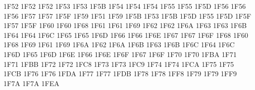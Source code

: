 \setcclcuc 1F52 1F52 1F52 %
\setcclcuc 1F53 1F53 1F5B %
\setcclcuc 1F54 1F54 1F54 %
\setcclcuc 1F55 1F55 1F5D %
\setcclcuc 1F56 1F56 1F56 %
\setcclcuc 1F57 1F57 1F5F %
\setcclcuc 1F59 1F51 1F59 %
\setcclcuc 1F5B 1F53 1F5B %
\setcclcuc 1F5D 1F55 1F5D %
\setcclcuc 1F5F 1F57 1F5F %
\setcclcuc 1F60 1F60 1F68 %
\setcclcuc 1F61 1F61 1F69 %
\setcclcuc 1F62 1F62 1F6A %
\setcclcuc 1F63 1F63 1F6B %
\setcclcuc 1F64 1F64 1F6C %
\setcclcuc 1F65 1F65 1F6D %
\setcclcuc 1F66 1F66 1F6E %
\setcclcuc 1F67 1F67 1F6F %
\setcclcuc 1F68 1F60 1F68 %
\setcclcuc 1F69 1F61 1F69 %
\setcclcuc 1F6A 1F62 1F6A %
\setcclcuc 1F6B 1F63 1F6B %
\setcclcuc 1F6C 1F64 1F6C %
\setcclcuc 1F6D 1F65 1F6D %
\setcclcuc 1F6E 1F66 1F6E %
\setcclcuc 1F6F 1F67 1F6F %
\setcclcuc 1F70 1F70 1FBA %
\setcclcuc 1F71 1F71 1FBB %
\setcclcuc 1F72 1F72 1FC8 %
\setcclcuc 1F73 1F73 1FC9 %
\setcclcuc 1F74 1F74 1FCA %
\setcclcuc 1F75 1F75 1FCB %
\setcclcuc 1F76 1F76 1FDA %
\setcclcuc 1F77 1F77 1FDB %
\setcclcuc 1F78 1F78 1FF8 %
\setcclcuc 1F79 1F79 1FF9 %
\setcclcuc 1F7A 1F7A 1FEA %
